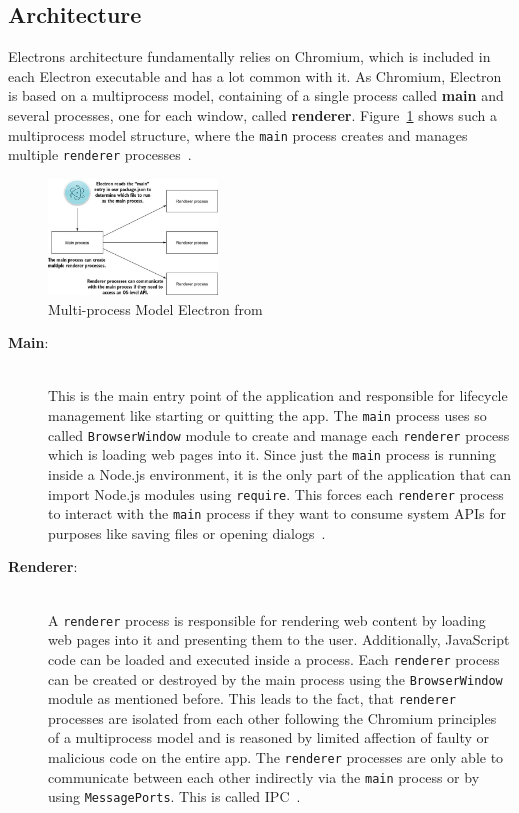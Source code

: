 \subsection{Architecture}
\label{subsec:electron:architecture}
Electrons architecture fundamentally relies on Chromium, which is included in each Electron executable and has a lot common with it.
As Chromium, Electron is based on a multiprocess model, containing of a single process called \textbf{main} and several processes, one for each window, called \textbf{renderer}.
Figure~\ref{fig:electron:model} shows such a multiprocess model structure, where the \texttt{main} process creates and manages multiple \texttt{renderer} processes~\cite[Chapter 1.5]{electron-in-action}.
\begin{figure}[ht]
    \centering
    \includegraphics[width=0.4\textwidth]{images/electron-model}
    \caption[Bla]{Multi-process Model Electron from~\cite[Fig. 1.7]{electron-in-action}}
    \label{fig:electron:model}
\end{figure}
\begin{description}
    \item[\textbf{Main}:] \hfill \\ This is the main entry point of the application and responsible for lifecycle management like starting or quitting the app.
    The \texttt{main} process uses so called \texttt{BrowserWindow} module to create and manage each \texttt{renderer} process which is loading web pages into it.
    Since just the \texttt{main} process is running inside a Node.js environment, it is the only part of the application that can import Node.js modules using \texttt{require}.
    This forces each \texttt{renderer} process to interact with the \texttt{main} process if they want to consume system \ac{API}s for purposes like saving files or opening dialogs~\cite{ElectronDoc}\cite{electron-in-action}.

    \item[\textbf{Renderer}:] \hfill \\ A \texttt{renderer} process is responsible for rendering web content by loading web pages into it and presenting them to the user.
    Additionally, JavaScript code can be loaded and executed inside a process.
    Each \texttt{renderer} process can be created or destroyed by the main process using the \texttt{BrowserWindow} module as mentioned before.
    This leads to the fact, that \texttt{renderer} processes are isolated from each other following the Chromium principles of a multiprocess model and is reasoned by limited affection of
    faulty or malicious code on the entire app.
    The \texttt{renderer} processes are only able to communicate between each other indirectly via the \texttt{main} process or by using \texttt{MessagePorts}.
    This is called \ac{IPC}~\cite{ElectronDoc}\cite{electron-in-action}.
\end{description}

